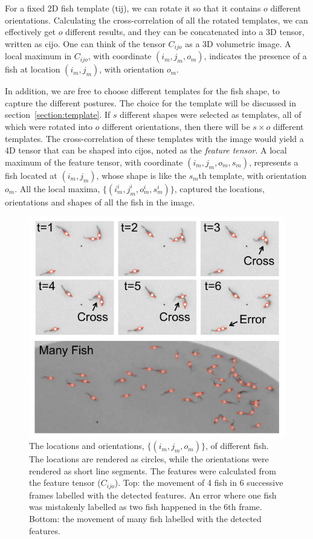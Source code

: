 \documentclass[11pt,twoside]{report}
\begin{document}
For a fixed 2D fish template (\gls{tij}), we can rotate it so that it contains $o$ different orientations. Calculating the cross-correlation of all the rotated templates, we can effectively get $o$ different results, and they can be concatenated into a 3D tensor, written as \gls{cijo}. One can think of the tensor $C_{ijo}$ as a 3D volumetric image. A local maximum in $C_{ijo}$, with coordinate $(i_m, j_m, o_m)$, indicates the presence of a fish at location $(i_m, j_m)$, with orientation $o_m$.


In addition, we are free to choose different templates for the fish shape, to capture the different postures. The choice for the template will be discussed in section~\ref{section:template}. If $s$ different shapes were selected as templates, all of which were rotated into $o$ different orientations, then there will be $s \times o$ different templates. The cross-correlation of these templates with the image would yield a 4D tensor that can be shaped into \gls{cijos}, noted as the \emph{feature tensor}. A local maximum of the feature tensor, with coordinate $(i_m, j_m, o_m, s_m)$, represents a fish located at $(i_m, j_m)$, whose shape is like the $s_m$th template, with orientation $o_m$. All the local maxima, {$\{(i_m^i, j_m^i, o_m^i, s_m^i)\}$}, captured the locations, orientations and shapes of all the fish in the image.

\begin{figure}
  \includegraphics[width=\linewidth,outer]{features}
  \caption[The correct label of overlapping fish.]{
  The locations and orientations, $\{(i_m, j_m, o_m)\}$, of different fish. The locations are rendered as circles, while the orientations were rendered as short line segments.
  The features were calculated from the feature tensor ($C_{ijo}$).
  Top: the movement of 4 fish in 6 successive frames labelled with the detected features. An error where one fish was mistakenly labelled as two fish happened in the 6th frame.
  Bottom: the movement of many fish labelled with the detected features.
  }
  \label{fig:fish_features}
\end{figure}
\end{document}
